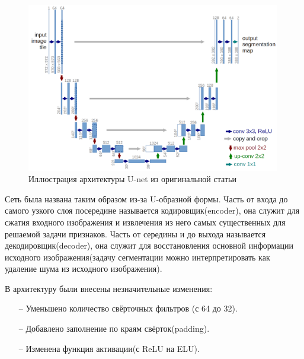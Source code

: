 \documentclass[12pt, a4paper]{extarticle}
\begin{document}
\begin{figure}[h!]
\includegraphics[width=0.99\textwidth]{data/images/u-net-architecture.png}
\caption{Иллюстрация архитектуры U-net из оригинальной статьи \cite{6}}
\label{unet_arch}
\end{figure}

Сеть была названа таким образом из-за U-образной формы. Часть от входа до самого узкого слоя посередине называется кодировщик(encoder), она служит для сжатия входного изображения и извлечения из него самых существенных для решаемой задачи признаков. 
Часть от середины и до выхода называется декодировщик(decoder), она служит для восстановления основной информации исходного изображения(задачу сегментации можно интерпретировать как удаление шума из исходного изображения).

В архитектуру \cite{6} были внесены незначительные изменения:
\begin{itemize}
	\item[--] Уменьшено количество свёрточных фильтров (с 64 до 32).
	
	\item[--] Добавлено заполнение по краям свёрток(padding).
	
	\item[--] Изменена функция активации(с ReLU на ELU).
\end{itemize}
\end{document}
